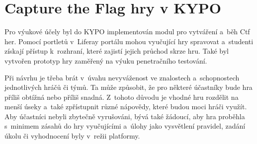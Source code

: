 \documentclass[
  digital, %
  oneside, %
  table,   %
  nolof,     %
  nolot,     %
]{fithesis3}
\begin{document}
\section{Capture the Flag hry v KYPO} \label{ctfGamesKYPO}
Pro výukové účely byl do KYPO implementován modul pro vytváření a~běh Ctf her. Pomocí portletů v~Liferay portálu mohou vyučující hry spravovat a~studenti získají přístup k~rozhraní, které zajistí jejich průchod skrze hru. Také byl vytvořen prototyp hry zaměřený na výuku penetračního testování.\par
Při návrhu je třeba brát v~úvahu nevyváženost ve znalostech a~schopnostech jednotlivých hráčů či týmů. Ta může způsobit, že pro některé účastníky bude hra příliš obtížná nebo příliš snadná. Z~tohoto důvodu je vhodné hru rozdělit na menší úseky a~také zpřístupnit různé nápovědy, které budou moci hráči využít. Aby účastníci nebyli zbytečně vyrušováni, bývá také žádoucí, aby hra proběhla s~minimem zásahů do hry vyučujícími a~úlohy jako vysvětlení pravidel, zadání úkolu či vyhodnocení byly v~režii platformy. \cite{ctfDesign} 
\end{document}
